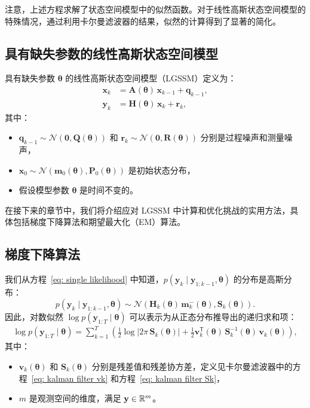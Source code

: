 注意，上述方程求解了状态空间模型中的似然函数。对于线性高斯状态空间模型的特殊情况，通过利用卡尔曼滤波器的结果，似然的计算得到了显著的简化。

\subsection{具有缺失参数的线性高斯状态空间模型}

具有缺失参数 \(\boldsymbol{\theta}\) 的线性高斯状态空间模型（LGSSM）定义为：
\begin{align}
    \mathbf{x}_k &= \mathbf{A}(\boldsymbol{\theta}) \, \mathbf{x}_{k-1} + \mathbf{q}_{k-1}, \\
    \mathbf{y}_k &= \mathbf{H}(\boldsymbol{\theta}) \, \mathbf{x}_k + \mathbf{r}_k,
\end{align}
其中：
\begin{itemize}
    \item \(\mathbf{q}_{k-1} \sim \mathcal{N}(\mathbf{0}, \mathbf{Q}(\boldsymbol{\theta}))\) 和 \(\mathbf{r}_{k} \sim \mathcal{N}(\mathbf{0}, \mathbf{R}(\boldsymbol{\theta}))\) 分别是过程噪声和测量噪声，
    \item \(\mathbf{x}_0 \sim \mathcal{N}(\mathbf{m}_0(\boldsymbol{\theta}), \mathbf{P}_0(\boldsymbol{\theta}))\) 是初始状态分布，
    \item 假设模型参数 \(\boldsymbol{\theta}\) 是时间不变的。
\end{itemize}

在接下来的章节中，我们将介绍应对 LGSSM 中计算和优化挑战的实用方法，具体包括梯度下降算法和期望最大化（EM）算法。

\subsection{梯度下降算法}

我们从方程~\eqref{eq: single likelihood} 中知道，\(p(\mathbf{y}_k \mid \mathbf{y}_{1:k-1}, \boldsymbol{\theta})\) 的分布是高斯分布：
\[
p(\mathbf{y}_k \mid \mathbf{y}_{1:k-1}, \boldsymbol{\theta}) \sim \mathcal{N}(\mathbf{H}_k(\boldsymbol{\theta}) \, \mathbf{m}_k^-(\boldsymbol{\theta}), \mathbf{S}_k(\boldsymbol{\theta})).
\]
因此，对数似然 \(\log p(\mathbf{y}_{1:T} \mid \boldsymbol{\theta})\) 可以表示为从正态分布推导出的递归求和项：
\begin{align}
    \log p(\mathbf{y}_{1:T} \mid \boldsymbol{\theta}) = \sum^T_{k=1} \left( \frac{1}{2} \log | 2 \pi \, \mathbf{S}_k(\boldsymbol{\theta}) | + \frac{1}{2} \mathbf{v}_k^{\mathsf{T}}(\boldsymbol{\theta}) \, \mathbf{S}_k^{-1}(\boldsymbol{\theta}) \, \mathbf{v}_k (\boldsymbol{\theta}) \right),
\end{align}
其中：
\begin{itemize}
    \item \(\mathbf{v}_k (\boldsymbol{\theta})\) 和 \(\mathbf{S}_k(\boldsymbol{\theta})\) 分别是残差值和残差协方差，定义见卡尔曼滤波器中的方程~\eqref{eq: kalman filter vk} 和方程~\eqref{eq: kalman filter Sk}，
    \item \(m\) 是观测空间的维度，满足 \(\mathbf{y} \in \mathbb{R}^m\)。
\end{itemize}

